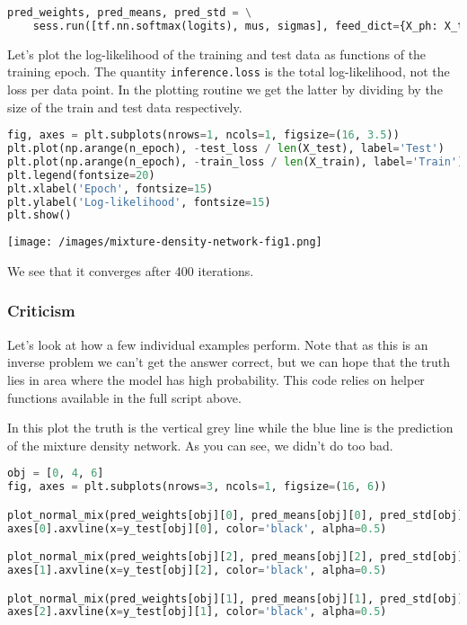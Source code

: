 \begin{lstlisting}[language=Python]
pred_weights, pred_means, pred_std = \
    sess.run([tf.nn.softmax(logits), mus, sigmas], feed_dict={X_ph: X_test})
\end{lstlisting}

Let's plot the log-likelihood of the training and test data as
functions of the training epoch. The quantity \texttt{inference.loss}
is the total log-likelihood, not the loss per data point.  In the
plotting routine we get the latter by dividing by the size of the
train and test data respectively.

\begin{lstlisting}[language=Python]
fig, axes = plt.subplots(nrows=1, ncols=1, figsize=(16, 3.5))
plt.plot(np.arange(n_epoch), -test_loss / len(X_test), label='Test')
plt.plot(np.arange(n_epoch), -train_loss / len(X_train), label='Train')
plt.legend(fontsize=20)
plt.xlabel('Epoch', fontsize=15)
plt.ylabel('Log-likelihood', fontsize=15)
plt.show()
\end{lstlisting}

\texttt{[image: /images/mixture-density-network-fig1.png]}

We see that it converges after 400 iterations.

\subsubsection{Criticism}

Let's look at how a few individual examples perform. Note that as this
is an inverse problem we can't get the answer correct, but we can hope
that the truth lies in area where the model has high probability. This code relies on helper functions
available in the full script above.

In this plot the truth is the vertical grey line while the blue line is the prediction of the mixture density network. As you can see, we didn't do too bad.

\begin{lstlisting}[language=Python]
obj = [0, 4, 6]
fig, axes = plt.subplots(nrows=3, ncols=1, figsize=(16, 6))

plot_normal_mix(pred_weights[obj][0], pred_means[obj][0], pred_std[obj][0], axes[0], comp=False)
axes[0].axvline(x=y_test[obj][0], color='black', alpha=0.5)

plot_normal_mix(pred_weights[obj][2], pred_means[obj][2], pred_std[obj][2], axes[1], comp=False)
axes[1].axvline(x=y_test[obj][2], color='black', alpha=0.5)

plot_normal_mix(pred_weights[obj][1], pred_means[obj][1], pred_std[obj][1], axes[2], comp=False)
axes[2].axvline(x=y_test[obj][1], color='black', alpha=0.5)
\end{lstlisting}

